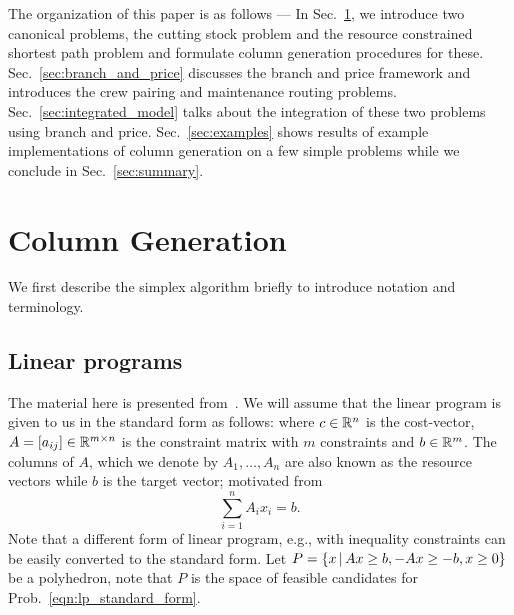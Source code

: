 \documentclass[letterpaper, 10pt, twocolumn, reqno]{amsart}
\begin{document}
The organization of this paper is as follows --- In Sec.~\ref{sec:column_generation}, we introduce two canonical problems, the cutting stock problem and the
resource constrained shortest path problem and formulate column generation procedures for these. Sec.~\ref{sec:branch_and_price} discusses the branch and
price framework and introduces the crew pairing and maintenance routing problems. Sec.~\ref{sec:integrated_model}
talks about the integration of these two problems using branch and price.
Sec.~\ref{sec:examples} shows results of example implementations of column generation on a few simple problems while we conclude in Sec.~\ref{sec:summary}.

\section{Column Generation}
\label{sec:column_generation}

We first describe the simplex algorithm briefly to introduce notation and terminology.

\subsection{Linear programs}
\label{ssec:lp_standard}

The material here is presented from~\cite{bertsimas1997introduction}. We will assume that the linear program is given to us in the standard form as follows:
where $c \in \mathbb{R}^n$ is the cost-vector, $A = [a_{ij}] \in \mathbb{R}^{m \times n}$ is the constraint matrix with $m$ constraints and $b \in \mathbb{R}^m$. The columns of $A$, which we denote by $A_1, \ldots, A_n$ are also known as the resource vectors while $b$ is the target vector; motivated from
$$\sum_{i=1}^n A_i x_i =b.$$
Note that a different form of linear program, e.g., with inequality constraints can be easily converted to the standard form.
Let $P = \left\{x \, \vert \, Ax \geq b, -Ax \geq -b, x \geq 0\right\}$ be a polyhedron, note that $P$ is the space of feasible candidates for Prob.~\eqref{eqn:lp_standard_form}.
\end{document}
